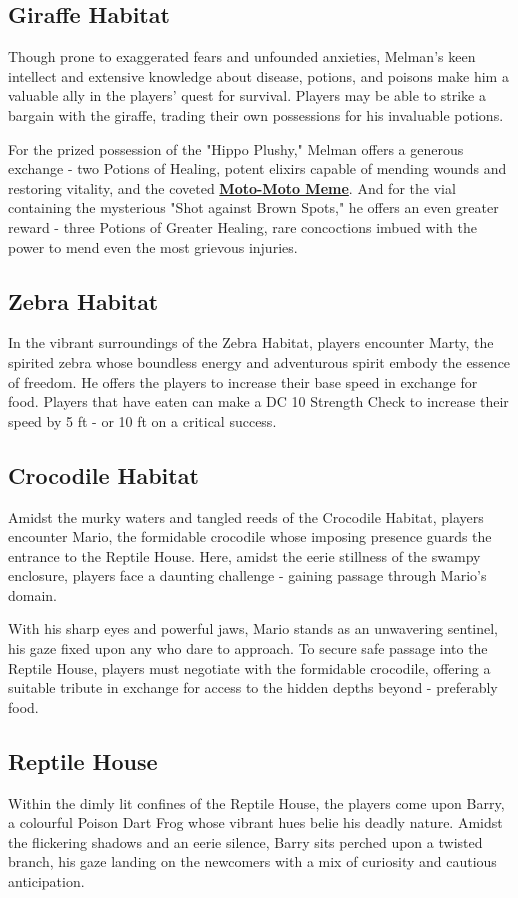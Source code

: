 \subsection*{ Giraffe Habitat}
Though prone to exaggerated fears and unfounded anxieties, Melman's keen intellect and extensive knowledge about disease, potions, and poisons make him a valuable ally in the players' quest for survival. Players may be able to strike a bargain with the giraffe, trading their own possessions for his invaluable potions.

For the prized possession of the "Hippo Plushy," Melman offers a generous exchange - two Potions of Healing, potent elixirs capable of mending wounds and restoring vitality, and the coveted \hyperref[sec:MotoMotoMeme]{\textbf{Moto-Moto Meme}}. And for the vial containing the mysterious "Shot against Brown Spots," he offers an even greater reward - three Potions of Greater Healing, rare concoctions imbued with the power to mend even the most grievous injuries.
\subsection*{ Zebra Habitat}
In the vibrant surroundings of the Zebra Habitat, players encounter Marty, the spirited zebra whose boundless energy and adventurous spirit embody the essence of freedom. He offers the players to increase their base speed in exchange for food. Players that have eaten can make a DC 10 Strength Check to increase their speed by 5 ft - or 10 ft on a critical success.

\subsection*{ Crocodile Habitat}
Amidst the murky waters and tangled reeds of the Crocodile Habitat, players encounter Mario, the formidable crocodile whose imposing presence guards the entrance to the Reptile House. Here, amidst the eerie stillness of the swampy enclosure, players face a daunting challenge - gaining passage through Mario's domain.

With his sharp eyes and powerful jaws, Mario stands as an unwavering sentinel, his gaze fixed upon any who dare to approach. To secure safe passage into the Reptile House, players must negotiate with the formidable crocodile, offering a suitable tribute in exchange for access to the hidden depths beyond - preferably food.
\subsection*{ Reptile House}
Within the dimly lit confines of the Reptile House, the players come upon Barry, a colourful Poison Dart Frog whose vibrant hues belie his deadly nature. Amidst the flickering shadows and an eerie silence, Barry sits perched upon a twisted branch, his gaze landing on the newcomers with a mix of curiosity and cautious anticipation.

